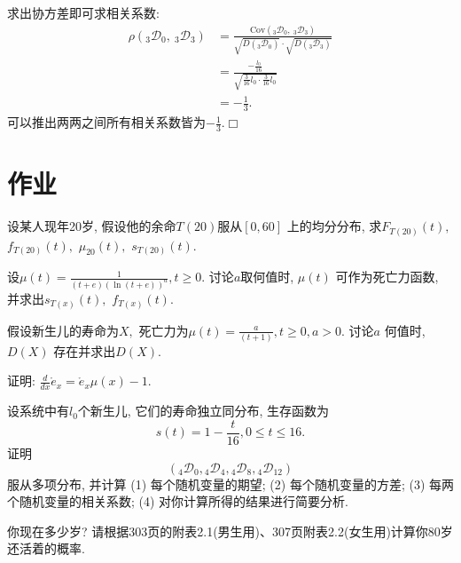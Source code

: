 \documentclass[a4paper,10pt]{ctexbook}
\def\qed{\hfill$\Box$\medskip}
\begin{document}
求出协方差即可求相关系数:
\begin{align*}
    \rho(_{3}\mathscr D _{0},\ _{3}\mathscr D _{3}) & =\frac{\text{Cov}(_{3}\mathscr D_{0},\ _{3}\mathscr D _{3})}{\sqrt{D(_{3}\mathscr D _{0})}\cdot \sqrt{D(_{3}\mathscr D _{3})}} \\
                                                    & =\frac{-\frac{l_{0}}{16}}{\sqrt{\frac{3}{16}l_{0}\cdot \frac{3}{16}l_{0}}}                                                     \\
                                                    & =-\frac{1}{3}.
\end{align*}
可以推出两两之间所有相关系数皆为$-\frac{1}{3}$.\qed

\section{作业}
\begin{exs}
    设某人现年20岁, 假设他的余命$T(20)$服从$[0,60]$ 上的均分分布, 求$F_{T(20)}(t),$ $ f_{T(20)}(t),$ $\mu_{20}(t),$ $s_{T(20)}(t).$
\end{exs}

\begin{exs}
    设$\mu(t)=\frac{1}{(t+e)(\ln (t+e))^a},t\ge0.$ 讨论$a$取何值时, $\mu(t)$ 可作为死亡力函数, 并求出$s_{T(x)}(t),$ $f_{T(x)}(t).$
\end{exs}

\begin{exs}
    假设新生儿的寿命为$X,$ 死亡力为$\mu(t)=\frac{a}{(t+1)},t\ge0, a>0.$ 讨论$a$ 何值时, $D(X)$ 存在并求出$D(X).$
\end{exs}

\begin{exs}
    证明: $\frac{d}{dx}\mathring e_x=\mathring e_x\mu(x)-1.$
\end{exs}

\begin{exs}设系统中有$l_0$个新生儿, 它们的寿命独立同分布, 生存函数为
    $$s(t)=1-\frac{t}{16}, 0\le t\le 16.$$ 证明$$({}_4\mathscr D_0, {}_4\mathscr D_4,{}_{4}\mathscr D_8, {}_{4}\mathscr D_{12})$$服从多项分布, 并计算 (1) 每个随机变量的期望; (2) 每个随机变量的方差; (3) 每两个随机变量的相关系数; (4) 对你计算所得的结果进行简要分析.
\end{exs}

\begin{exs}
    你现在多少岁? 请根据303页的附表2.1(男生用)、307页附表2.2(女生用)计算你80岁还活着的概率.
\end{exs}
\end{document}
